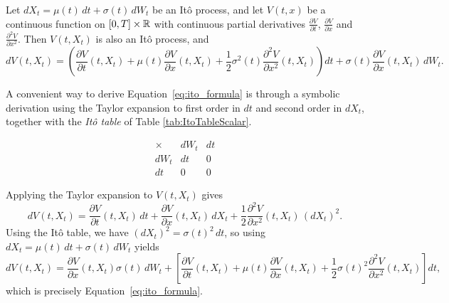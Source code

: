 \begin{theorem}\label{theorem:itorule}
    Let $dX_t = \mu(t)\,dt + \sigma(t)\,dW_t$ be an Itô process, and let 
    $V(t,x)$ be a continuous function on $[0,T] \times \mathbb{R}$ with continuous partial derivatives 
    $\frac{\partial V}{\partial t}$, $\frac{\partial V}{\partial x}$ and $\frac{\partial^2 V}{\partial x^2}$.
    Then $V(t,X_t)$ is also an Itô process, and
    \begin{equation}\label{eq:ito_formula}
        dV(t,X_t) 
        = \left(
            \frac{\partial V}{\partial t}(t,X_t)
            + \mu(t)\frac{\partial V}{\partial x}(t,X_t)
            + \frac{1}{2}\sigma^2(t)\frac{\partial^2 V}{\partial x^2}(t,X_t)
        \right) dt
        + \sigma(t)\frac{\partial V}{\partial x}(t,X_t)\,dW_t.
    \end{equation}
\qedopen
\end{theorem}

\vspace{-0.3cm}

\noindent
A convenient way to derive Equation~\eqref{eq:ito_formula} is through a symbolic
derivation using the Taylor expansion to first order in $dt$ and second order in $dX_t$,
together with the \textit{Itô table} of Table \ref{tab:ItoTableScalar}.


\vspace{-0.75cm}

\begin{center}
\[
\begin{array}{c|cc}
\times & dW_t & dt \\ \hline
dW_t & dt & 0 \\
dt & 0 & 0
\end{array}
\]
{%
\label{tab:ItoTableScalar}}
\end{center}


\vspace{-0.3cm}

\noindent
Applying the Taylor expansion to $V(t,X_t)$ gives
\[
dV(t,X_t)
= \frac{\partial V}{\partial t}(t,X_t)\,dt
+ \frac{\partial V}{\partial x}(t,X_t)\,dX_t
+ \frac{1}{2}\frac{\partial^2 V}{\partial x^2}(t,X_t)\,(dX_t)^2.
\]
Using the Itô table, we have $(dX_t)^2 = \sigma(t)^2\,dt$, so using
$dX_t = \mu(t)\,dt + \sigma(t)\,dW_t$ yields
\[
dV(t,X_t)
= \frac{\partial V}{\partial x}(t,X_t)\sigma(t)\,dW_t
+ \left[
\frac{\partial V}{\partial t}(t,X_t)
+ \mu(t)\frac{\partial V}{\partial x}(t,X_t)
+ \frac{1}{2}\sigma(t)^2\frac{\partial^2 V}{\partial x^2}(t,X_t)
\right] dt,
\]
which is precisely Equation~\eqref{eq:ito_formula}.

